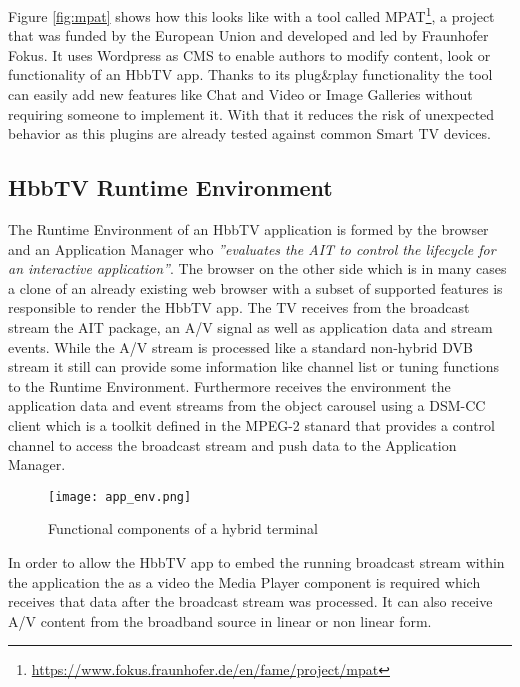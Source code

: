 Figure \ref{fig:mpat} shows how this looks like with a tool called MPAT\footnote{\url{https://www.fokus.fraunhofer.de/en/fame/project/mpat}},
a project that was funded by the European Union and developed and led by Fraunhofer Fokus.
It uses Wordpress as CMS to enable authors to modify content, look or functionality of an HbbTV
app. Thanks to its plug\&play functionality the tool can easily add new features like Chat and Video or
Image Galleries without requiring someone to implement it. With that it reduces the risk of unexpected
behavior as this plugins are already tested against common Smart TV devices.

\subsection{HbbTV Runtime Environment\label{sec:hbbtvruntimeenvironment}}

The Runtime Environment of an HbbTV application is formed by the browser and an Application Manager who
\textit{''evaluates the AIT to control the lifecycle for an interactive application''}\cite{hbbtv15}.
The browser on the other side which is in many cases a clone of an already existing web browser with
a subset of supported features is responsible to render the HbbTV app. The TV receives from the broadcast
stream the AIT package, an A/V signal as well as application data and stream events. While the A/V
stream is processed like a standard non-hybrid DVB stream it still can provide some information like
channel list or tuning functions to the Runtime Environment. Furthermore receives the environment
the application data and event streams from the object carousel using a DSM-CC client which is a
toolkit defined in the MPEG-2 stanard that provides a control channel to access the broadcast stream
and push data to the Application Manager.

\begin{figure}[htb]
  \centering
  \texttt{[image: app\_env.png]}\\
  \caption{
    Functional components of a hybrid terminal
  }
  \label{fig:app_env}
\end{figure}

In order to allow the HbbTV app to embed the running broadcast stream within the application the
as a video the Media Player component is required which receives that data after the broadcast
stream was processed. It can also receive A/V content from the broadband source in linear or non
linear form.

